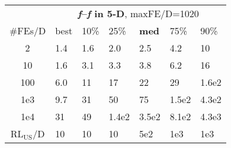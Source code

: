 \begin{tabular}{c|llllll}
 & \multicolumn{6}{|c}{\textbf{\textit{f}\raisebox{-0.35ex}{1}--\textit{f}\raisebox{-0.35ex}{24} in 5-D}, maxFE/D=1020}\\
\#FEs/D & best & 10\% & 25\% & \textbf{med} & 75\% & 90\%\\
2 & \hspace*{1ex}1.4 & \hspace*{1ex}1.6 & \hspace*{1ex}2.0 & \hspace*{1ex}2.5 & \hspace*{1ex}4.2 & 10\\
10 & \hspace*{1ex}1.6 & \hspace*{1ex}3.1 & \hspace*{1ex}3.3 & \hspace*{1ex}3.8 & \hspace*{1ex}6.2 & 16\\
100 & \hspace*{1ex}6.0 & 11 & 17 & 22 & 29 & 1.6e2\\
1e3 & \hspace*{1ex}9.7 & 31 & 50 & 75 & 1.5e2 & 4.3e2\\
1e4 & 31 & 49 & 1.4e2 & 3.5e2 & 8.1e2 & 4.3e3\\
$\text{RL}_{\text{US}}$/D & 10 & 10 & 10 & 5e2 & 1e3 & 1e3
\end{tabular}
